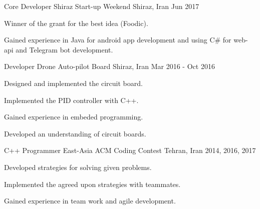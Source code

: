 \begin{minipage}[t]{0.48\linewidth}
\begin{cventries}
  \cventry
    {Core Developer} %
    {Shiraz Start-up Weekend} %
    {Shiraz, Iran} %
    {Jun 2017} %
    {
      \begin{cvitems} %
        \item {Winner of the grant for the best idea (Foodic).}
        \item {Gained experience in Java for android app development and using C\# for web-api and Telegram bot development.}
      \end{cvitems}
    }
  \cventry
    {Developer} %
    {Drone Auto-pilot Board} %
    {Shiraz, Iran} %
    {Mar 2016 - Oct 2016} %
    {
      \begin{cvitems} %
        \item {Designed and implemented the circuit board.}
        \item {Implemented the PID controller with C++.}
        \item {Gained experience in embeded programming.}
        \item {Developed an understanding of circuit boards.}
      \end{cvitems}
      }
  \cventry
    {C++ Programmer} %
    {East-Asia ACM Coding Contest} %
    {Tehran, Iran} %
    {2014, 2016, 2017} %
    {
      \begin{cvitems} %
        \item {Developed strategies for solving given problems.}
        \item {Implemented the agreed upon strategies with teammates.}
        \item {Gained experience in team work and agile development.}
      \end{cvitems}
    }
\
\end{cventries}
\end{minipage}
\vspace{3mm}\\